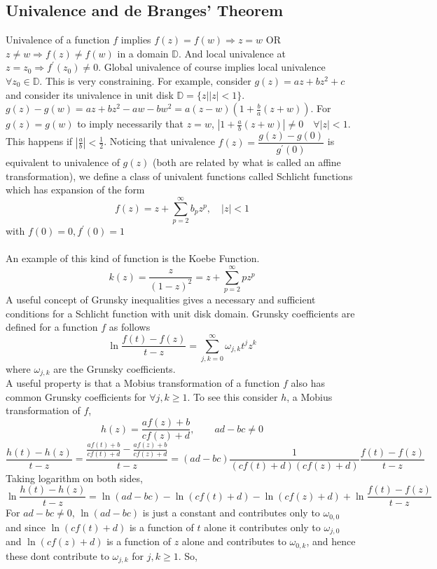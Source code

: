 ﻿\documentclass[12pt,a4paper]{article}
\begin{document}
\subsection{Univalence and de Branges' Theorem}
Univalence of a function $f$ implies $f(z)=f(w) \Rightarrow z=w$ OR $z\neq w \Rightarrow f(z)\neq f(w)$ in a domain $\mathbb{D}$. And local univalence at $z=z_{0} \Rightarrow f^{\prime}\left(z_{0}\right) \neq 0$. Global univalence of course implies local univalence $\forall z_{0} \in \mathbb{D}$. This is very constraining. For example, consider $g(z)=az+b z^{2}+c$ and consider its univalence in unit disk $\mathbb{D}=\{ z\left| |z|<1 \right. \}$. $g(z)-g(w)=az+b z^{2} -aw-b w^{2}=a(z-w)(1+\frac{b}{a}(z+w))$. For $g(z)=g(w)$ to imply necessarily that $z=w$, $|1+\frac{a}{b}(z+w)|\neq 0 \quad \forall |z|<1$. This happens if $|\frac{a}{b}|<\frac{1}{2}$. Noticing that univalence $f(z)=\dfrac{g(z)-g(0)}{g^{\prime}(0)}$ is equivalent to univalence of $g(z)$ (both are related by what is called an affine transformation), we define a class of univalent functions called Schlicht functions which has expansion of the form
$$
f(z)=z+\sum_{p=2}^{\infty} b_{p} z^{p}, \quad|z|<1
$$
with $f(0)=0, f^{\prime}(0)=1$\\\\
An example of this kind of function is the Koebe Function.
$$
k(z)=\frac{z}{(1-z)^{2}}=z+\sum_{p=2}^{\infty} p z^{p}
$$
A useful concept of Grunsky inequalities gives a necessary and sufficient conditions for a Schlicht function with unit disk domain. Grunsky coefficients are defined for a function $f$ as follows
$$
\ln \frac{f(t)-f(z)}{t-z}=\sum_{j, k=0}^{\infty} \omega_{j, k} t^{j} z^{k}
$$
where $\omega_{j, k}$ are the Grunsky coefficients. \\
A useful property is that a Mobius transformation of a function $f$ also has common Grunsky coefficients for $\forall j,k\geq 1$. To see this consider $h$, a Mobius transformation of $f$,
$$
h(z)=\frac{a f(z)+b}{c f(z)+d}, \qquad a d-b c \neq 0
$$
$$
\frac{h(t)-h(z)}{t-z}=\frac{\frac{a f(t)+b}{c f(t)+d}-\frac{a f(z)+b}{c f(z)+d}}{t-z}=(ad-bc)\frac{1}{(c f(t)+d)(c f(z)+d)}\frac{f(t)-f(z)}{t-z}
$$
Taking logarithm on both sides,
$$
\ln \frac{h(t)-h(z)}{t-z}=\ln (ad-bc)-\ln (c f(t)+d)-\ln (c f(z)+d)+ \ln \frac{f(t)-f(z)}{t-z}
$$
For $ad-bc\neq 0$, $\ln (ad-bc)$ is just a constant and contributes only to $\omega_{0,0}$ and since $\ln (c f(t)+d)$ is a function of $t$ alone it contributes only to $\omega_{j, 0}$ and $\ln (c f(z)+d)$ is a function of $z$ alone and contributes to $\omega_{0, k}$, and hence these dont contribute to $\omega_{j, k}$ for $j,k\geq 1$. So,
\end{document}
